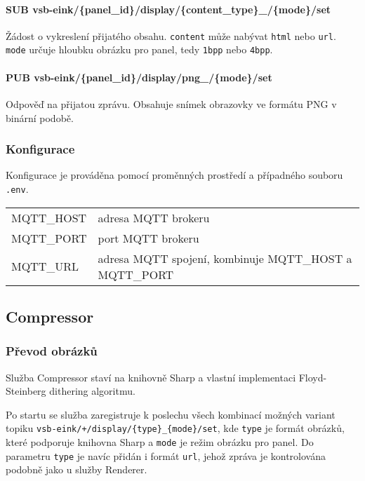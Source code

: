 \paragraph*{SUB vsb-eink/\{panel\_id\}/display/\{content\_type\}\_/\{mode\}/set} Žádost o vykreslení přijatého obsahu. \lstinline|content| může nabývat \lstinline|html| nebo \lstinline|url|. \lstinline|mode| určuje hloubku obrázku pro panel, tedy \lstinline|1bpp| nebo \lstinline|4bpp|.

\paragraph*{PUB vsb-eink/\{panel\_id\}/display/png\_/\{mode\}/set} Odpověď na přijatou zprávu. Obsahuje snímek obrazovky ve formátu PNG v binární podobě.

\subsubsection{Konfigurace}
Konfigurace je prováděna pomocí proměnných prostředí a případného souboru \lstinline{.env}.
\begin{table}[h]
    \begin{tabular}{ll}
        MQTT\_HOST & adresa MQTT brokeru \\
        MQTT\_PORT & port MQTT brokeru \\
        MQTT\_URL & adresa MQTT spojení, kombinuje MQTT\_HOST a MQTT\_PORT \\
    \end{tabular}
\end{table}

\subsection{Compressor}
\subsubsection{Převod obrázků}
Služba Compressor staví na knihovně Sharp \cite{fullerLovellSharp2024} a vlastní implementaci Floyd-Steinberg dithering algoritmu.

Po startu se služba zaregistruje k poslechu všech kombinací možných variant topiku \lstinline|vsb-eink/+/display/{type}_{mode}/set|, kde \lstinline|type| je formát obrázků, které podporuje knihovna Sharp a \lstinline|mode| je režim obrázku pro panel. Do parametru \lstinline|type| je navíc přidán i formát \lstinline|url|, jehož zpráva je kontrolována podobně jako u služby Renderer.

